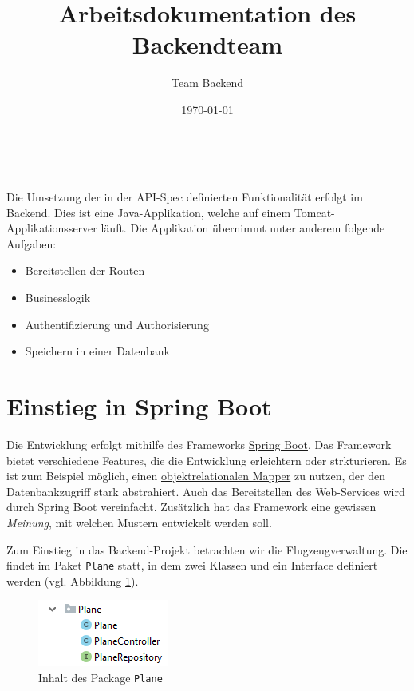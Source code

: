 \documentclass[a4paper, 11pt]{article}
\title{\textbf{Arbeitsdokumentation des Backendteam}}
\author{Team Backend}
\date{\today} %
\makeatletter
\renewcommand{\maketitle}{ %
\begin{flushright} %
{\LARGE\@title} %

\vspace{10pt} %

{\large\@author} %
\\\@date %

\vspace{20pt} %
\end{flushright}
}
\makeatother
\begin{document}
\renewcommand{\@listI}{\itemsep=0pt} %

\maketitle %

Die Umsetzung der in der API-Spec definierten Funktionalität erfolgt im
Backend. Dies ist eine Java-Applikation, welche auf einem
Tomcat-Appli\-ka\-tions\-server läuft. Die Applikation übernimmt unter anderem
folgende Aufgaben:

\begin{itemize}
    \item Bereitstellen der Routen
    \item Businesslogik
    \item Authentifizierung und Authorisierung
    \item Speichern in einer Datenbank
\end{itemize}

\section{Einstieg in Spring Boot}

Die Entwicklung erfolgt mithilfe des Frameworks
\href{https://en.wikipedia.org/wiki/Spring_Boot#Spring_Boot}{Spring Boot}. Das
Framework bietet verschiedene Features, die die Entwicklung erleichtern oder
strkturieren. Es ist zum Beispiel möglich, einen
\href{https://de.wikipedia.org/wiki/Objektrelationale_Abbildung}{objektrelationalen
Mapper}
zu nutzen, der den Datenbankzugriff stark abstrahiert. Auch das Bereitstellen
des Web-Services wird durch Spring Boot vereinfacht. Zusätzlich hat das
Framework eine gewissen \emph{Meinung}, mit welchen Mustern entwickelt werden
soll.

Zum Einstieg in das Backend-Projekt betrachten wir die Flugzeugverwaltung. Die
findet im Paket \texttt{Plane} statt, in dem zwei Klassen und ein Interface
definiert werden (vgl. Abbildung \ref{fig:planes_package}).

\begin{figure}[htpb]
    \centering
    \includegraphics{images/plane_package.png}
    \caption{Inhalt des Package \texttt{Plane}}
    \label{fig:planes_package}
\end{figure}
\end{document}
